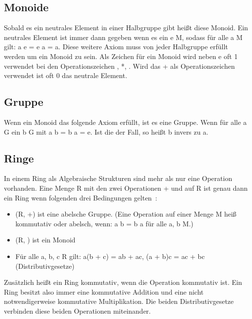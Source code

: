 		\subsection{Monoide}
			Sobald es ein neutrales Element in einer Halbgruppe gibt heißt diese Monoid. Ein neutrales Element ist immer dann gegeben wenn es ein e \myin M, sodass für alle a \myin M gilt: a \mycirc e = e \mycirc a = a. Diese weitere Axiom muss von jeder Halbgruppe erfüllt werden um ein Monoid zu sein. Als Zeichen für ein Monoid wird neben e oft 1 verwendet bei den Operationszeichen \mycirc, *, \mycdot. Wird das + als Operationszeichen verwendet ist oft 0 das neutrale Element.~\cite{Erste:Hilfe:in:Linearer:Algebra}
		
		\subsection{Gruppe}
			Wenn ein Monoid das folgende Axiom erfüllt, ist es eine Gruppe. Wenn für alle a \myin G ein b \myin G mit a \mycirc b = b \mycirc a = e. Ist die der Fall, so heißt b invers zu a.~\cite{Erste:Hilfe:in:Linearer:Algebra}
		
		\subsection{Ringe}
			In einem Ring als Algebraische Strukturen sind mehr als nur eine Operation vorhanden. Eine Menge R mit den zwei Operationen + und \mycdot auf R ist genau dann ein Ring wenn folgenden drei Bedingungen gelten~\cite{Erste:Hilfe:in:Linearer:Algebra}:
			
			\begin{itemize}
				\item (R, +) ist eine abelsche Gruppe. (Eine Operation \mycirc auf einer Menge M heiß kommutativ oder abelsch, wenn: a \mycirc b = b \mycirc a für alle a, b \myin M.)
				\item (R, \mycdot) ist ein Monoid
				\item Für alle a, b, c \myin R gilt: a(b + c) = ab + ac, (a + b)c = ac + bc (Distributivgesetze)
			\end{itemize}
			
			Zusätzlich heißt ein Ring kommutativ, wenn die Operation \mycdot kommutativ ist. Ein Ring besitzt also immer eine kommutative Addition und eine nicht notwendigerweise kommutative Multiplikation. Die beiden Distributivgesetze verbinden diese beiden Operationen miteinander.~\cite{Erste:Hilfe:in:Linearer:Algebra}
			
